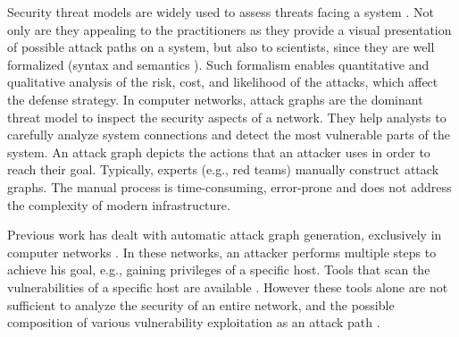 Security threat models are widely used to assess threats facing a system \cite{kordy2014dag}. Not only are they appealing to the practitioners as they provide a visual presentation of possible attack paths on a system, but also to scientists, since they are well formalized (syntax and semantics \cite{mauw2005foundations,jha2002two}). Such formalism enables quantitative and qualitative analysis of the risk, cost, and likelihood of the attacks, which affect the defense strategy. In computer networks, attack graphs \cite{sheyner2002automated,ou2006scalable} are the dominant threat model to inspect the security aspects of a network. They help analysts to carefully analyze system connections and detect the most vulnerable parts of the system. An attack graph depicts the actions that an attacker uses in order to reach their goal. Typically, experts (e.g., red teams) manually construct attack graphs. The manual process is time-consuming, error-prone and does not address the complexity of modern infrastructure.  %


Previous work has dealt with automatic attack graph generation, exclusively in computer networks \cite{ingols2006practical, sheyner2002automated,  sheyner2003tools, ou2006scalable}. In these networks, an attacker performs multiple steps to achieve his goal, e.g., gaining privileges of a specific host. Tools that scan the vulnerabilities of a specific host are available \cite{farmer1990cops}. However these tools alone are not sufficient to analyze the security of an entire network, and the possible composition of various vulnerability exploitation as an attack path \cite{sheyner2002automated}. 


